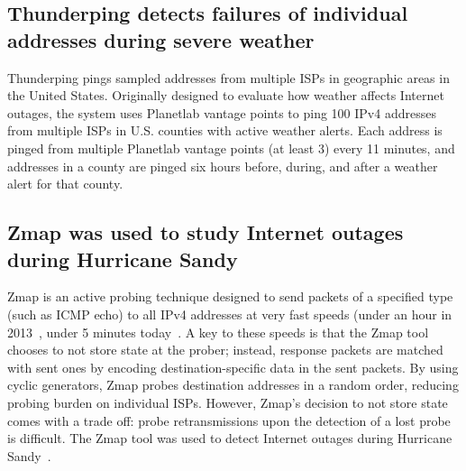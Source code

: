 \subsection{Thunderping detects failures of individual addresses
  during severe weather}

Thunderping pings
sampled addresses from multiple ISPs in geographic areas in the United
States. Originally designed to evaluate how weather affects Internet
outages, the system uses Planetlab vantage points to ping 100 IPv4
addresses from multiple ISPs in U.S. counties with active
weather alerts. Each address is pinged from multiple Planetlab vantage
points (at least 3) every 11 minutes, and addresses in a county are
pinged six hours before, during, and after a weather alert for that
county. 


\subsection{Zmap was used to study Internet outages during
  Hurricane Sandy}

Zmap is an active probing technique designed to send packets of a
specified type (such as ICMP echo) to all IPv4 addresses at
very fast speeds (under an hour in 2013~\cite{durumeric2013zmap},
under 5 minutes today~\cite{zippier-zmap}. A key to these speeds is that the
Zmap tool chooses to not store state at the prober; instead, response
packets are matched with sent ones by encoding destination-specific data
in the sent packets. By using cyclic generators, Zmap probes
destination addresses in a random order, reducing probing burden on
individual ISPs. However, Zmap's decision to not store state comes
with a trade off: probe retransmissions upon the detection of a lost
probe is difficult. The Zmap
tool was used to detect Internet outages during Hurricane
Sandy~\cite{durumeric2013zmap}. %



